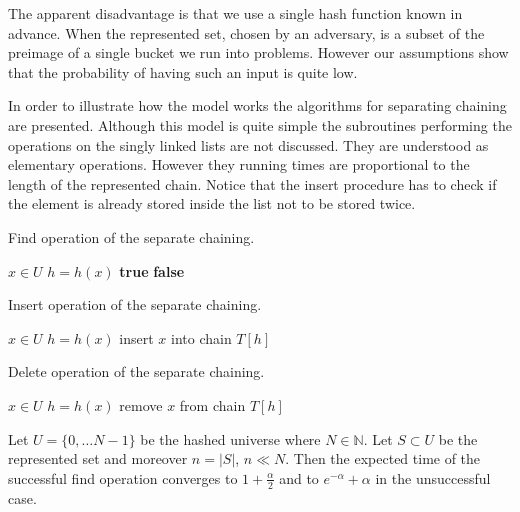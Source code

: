 The apparent disadvantage is that we use a single hash function known in advance. When the represented set, chosen by an adversary, is a subset of the preimage of a single bucket we run into problems. However our assumptions show that the probability of having such an input is quite low.

In order to illustrate how the model works the algorithms for separating chaining are presented. Although this model is quite simple the subroutines performing the operations on the singly linked lists are not discussed. They are understood as elementary operations. However they running times are proportional to the length of the represented chain. Notice that the insert procedure has to check if the element is already stored inside the list not to be stored twice. 

\begin{algorithm}
\caption{Find operation of the separate chaining.}
\label{algorithm-find-separate-chaining}
\begin{algorithmic}
\REQUIRE $x \in U$
\STATE $h = h(x)$
\STATE
{}
	\RETURN \textbf{true} 
\ELSE
	\RETURN \textbf{false} 
\ENDIF
\end{algorithmic}
\end{algorithm}

\begin{algorithm}
\caption{Insert operation of the separate chaining.}
\label{algorithm-insert-separate-chaining}
\begin{algorithmic}
\REQUIRE $x \in U$
\STATE $h = h(x)$
\STATE
{}
	\STATE insert $x$ into chain $T[h]$
\ENDIF
\end{algorithmic}
\end{algorithm}

\begin{algorithm}
\caption{Delete operation of the separate chaining.}
\label{algorithm-delete-separate-chaining}
\begin{algorithmic}
\REQUIRE $x \in U$
\STATE $h = h(x)$
\STATE
{}
	\STATE remove $x$ from chain $T[h]$
\ENDIF
\end{algorithmic}
\end{algorithm}

\begin{theorem}
Let $U = \{0, \dots N - 1\}$ be the hashed universe where $N \in \mathbb{N}$. Let $S \subset U$ be the represented set and moreover $n = |S|$, $n \ll N$. Then the expected time of the successful find operation converges to $1 + \frac{\alpha}{2}$ and to $e^{-\alpha} + \alpha$ in the unsuccessful case.
\end{theorem}

